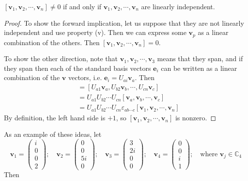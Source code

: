 \documentclass{article}
\begin{document}
	\begin{proposition}
		$[ \bm v_1, \bm v_2, \cdots, \bm v_n] \neq 0$ if and only if $\bm v_1, \bm v_2, \cdots, \bm v_n$ are linearly independent.
	\end{proposition}
	\begin{proof}
		To show the forward implication, let us suppose that they are not linearly independent and use property (v). Then we can express some $\bm v_p$ as a linear combination of the others. Then $[\bm v_1, \bm v_2, \cdots, \bm v_n] = 0$.

		To show the other direction, note that $\bm v_1, \bm v_2, \cdots, \bm v_3$ means that they span, and if they span then each of the standard basis vectors $\bm e_i$ can be written as a linear combination of the $\bm v$ vectors, i.e. $\bm e_i = U_{ai} \bm v_a$. Then
		\begin{align*}
			[\bm e_1, \bm e_2, \cdots, \bm e_n] &= [U_{a1}\bm v_a, U_{b2}\bm v_b, \cdots, U_{cn}\bm v_c] \\
			&= U_{a1}U_{b2}\cdots U_{cn}[\bm v_a, \bm v_b, \cdots, \bm v_c] \\
			&= U_{a1}U_{b2}\cdots U_{cn} \varepsilon_{ab\cdots c}[\bm v_1, \bm v_2, \cdots, \bm v_n]
		\end{align*}
		By definition, the left hand side is $+1$, so $[\bm v_1, \bm v_2, \cdots, \bm v_n]$ is nonzero.
	\end{proof}
	As an example of these ideas, let
	\[ \bm v_1 = \begin{pmatrix} i \\ 0 \\ 0 \\ 2 \end{pmatrix};\quad\bm v_2 = \begin{pmatrix} 0 \\ 0 \\ 5i \\ 0 \end{pmatrix};\quad\bm v_3 = \begin{pmatrix} 3 \\ 2i \\ 0 \\ 0 \end{pmatrix};\quad\bm v_4 = \begin{pmatrix} 0 \\ 0 \\ i \\ 1 \end{pmatrix};\quad \text{where }\bm v_j \in \mathbb C_4 \]
	Then
\end{document}
